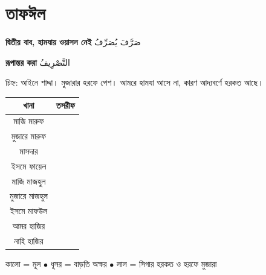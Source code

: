 \newpage

\section{তাফঈল}

\begin{center}
  \textbf{দ্বিতীয় বাব, হামযায় ওয়াসল নেই}
  \enspace
  {\arabicfont \textarabic{صَرَّفَ يُصَرِّفُ}}
\end{center}

\vspace{0.2cm}

\begin{center}
  \textbf{রূপান্তর করা}
  \enspace
  {\arabicfont \textarabic{التَّصْرِيفُ}}
\end{center}

\vspace{0.25cm}

\noindent চিহ্ন: আইনে শাদ্দা। মুজারার হরফে পেশ।
আমরে হামযা আসে না, কারণ আদ্যবর্ণে হরকত আছে।

\vspace{0.3cm}

\begingroup
\setlength{\arrayrulewidth}{0.5pt}
\setlength{\tabcolsep}{4pt}
\renewcommand{\arraystretch}{1.85}

\noindent\begin{tabularx}{\textwidth}{|C|C|}
  \hline
  {\color{white}\textbf{খানা}} &
  {\color{white}\textbf{তসরীফ}} \\
  \hline
  মাজি মারুফ &
  {\arabicfont {}} \\
  \hline
  মুজারে মারুফ &
  {\arabicfont {}} \\
  \hline
  মাসদার &
  {\arabicfont \textarabic{}} \\
  \hline
  ইসমে ফায়েল &
  {\arabicfont \textarabic{}} \\
  \hline
  মাজি মাজহুল &
  {\arabicfont {}} \\
  \hline
  মুজারে মাজহুল &
  {\arabicfont {}} \\
  \hline
  ইসমে মাফউল &
  {\arabicfont \textarabic{}} \\
  \hline
  আমর হাজির &
  {\arabicfont {}} \\
  \hline
  নাহি হাজির &
  {\arabicfont {}} \\
  \hline
\end{tabularx}
\endgroup

\vspace{0.25cm}

\begin{center}
  {\small
    কালো = মূল
    \enspace$\bullet$\enspace
    ধূসর = বাড়তি অক্ষর
    \enspace$\bullet$\enspace
    লাল = সিগার হরকত ও হরফে মুজারা
  }
\end{center}
